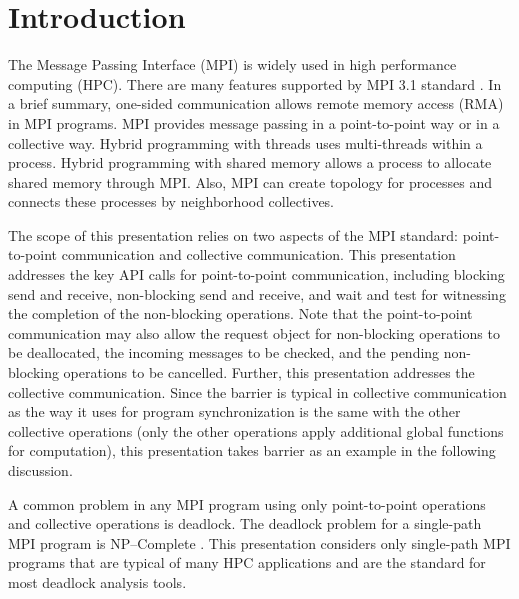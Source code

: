 \section{Introduction}

The Message Passing Interface (MPI) is widely used in high performance computing (HPC). 
There are many features supported by MPI 3.1 standard \cite{mpi3.1}. In a brief summary, one-sided communication allows remote memory access (RMA) in MPI programs. MPI provides message passing in a point-to-point way or in a collective way. Hybrid programming with threads uses multi-threads within a process. Hybrid programming with shared memory allows a process to allocate shared memory through MPI. Also, MPI can create topology for processes and connects these processes by neighborhood collectives.  

The scope of this presentation relies on two aspects of the MPI standard: point-to-point communication and collective communication. This presentation addresses the key API calls for point-to-point communication, including blocking send and receive, non-blocking send and receive, and wait and test for witnessing the completion of the non-blocking operations. Note that the point-to-point communication may also allow the request object for non-blocking operations to be deallocated, the incoming messages to be checked, and the pending non-blocking operations to be cancelled. 
Further, this presentation addresses the collective communication. Since the barrier is typical in collective communication as the way it uses for program synchronization is the same with the other collective operations (only the other operations apply additional global functions for computation), this presentation takes barrier as an example in the following discussion.

A common problem in any MPI program using only point-to-point operations and collective operations is deadlock. The deadlock problem for a single-path MPI program is NP--Complete \cite{DBLP:conf/fm/ForejtKNS14}.
This presentation considers only single-path MPI programs that are typical of many HPC applications and are the standard for most deadlock analysis tools. 

